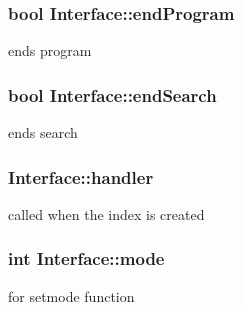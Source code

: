 \subsubsection[{end\+Program}]{\setlength{\rightskip}{0pt plus 5cm}bool Interface\+::end\+Program\hspace{0.3cm}{\ttfamily [private]}}\label{class_interface_a81680e55e0deb21de6e1c7d802ccf2b8}


ends program 

\hypertarget{class_interface_acd8a62dd37c5774058cbaee915b0d9fe}{}
\subsubsection[{end\+Search}]{\setlength{\rightskip}{0pt plus 5cm}bool Interface\+::end\+Search\hspace{0.3cm}{\ttfamily [private]}}\label{class_interface_acd8a62dd37c5774058cbaee915b0d9fe}


ends search 

\hypertarget{class_interface_a596b02db00f1f13e0955444504c3752c}{}
\subsubsection[{handler}]{ Interface\+::handler\hspace{0.3cm}{\ttfamily [private]}}\label{class_interface_a596b02db00f1f13e0955444504c3752c}


called when the index is created 

\hypertarget{class_interface_a272ffd81b79f689429ef27b6e8345fcf}{}
\subsubsection[{mode}]{\setlength{\rightskip}{0pt plus 5cm}int Interface\+::mode\hspace{0.3cm}{\ttfamily [private]}}\label{class_interface_a272ffd81b79f689429ef27b6e8345fcf}


for setmode function 

\hypertarget{class_interface_a1898f75ce60e62537678004d2dd5b627}{}
